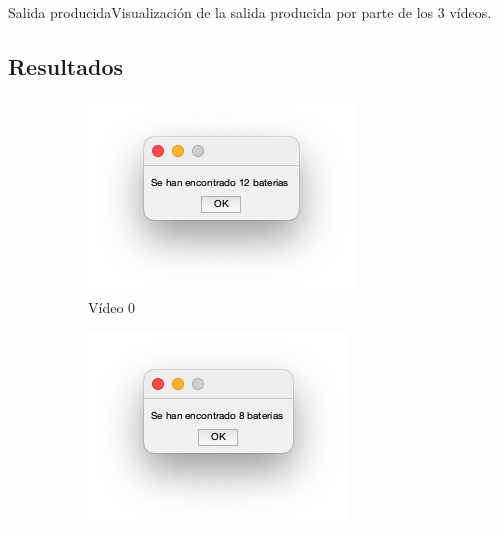 \documentclass{beamer}
\begin{document}
\begin{frame}{Salida producida}{Visualización de la salida producida por parte de los 3 vídeos.}
\subsection{Resultados}
\begin{figure}
\begin{center}
\begin{subfigure}[b]{0.3\textwidth}
        \includegraphics[width=\textwidth]{img/S0.png}
        \caption{Vídeo 0}
    \end{subfigure}
    \begin{subfigure}[b]{0.3\textwidth}
        \includegraphics[width=\textwidth]{img/S1.png}

\end{subfigure}
\end{center}
\end{figure}
\end{frame}
\end{document}
